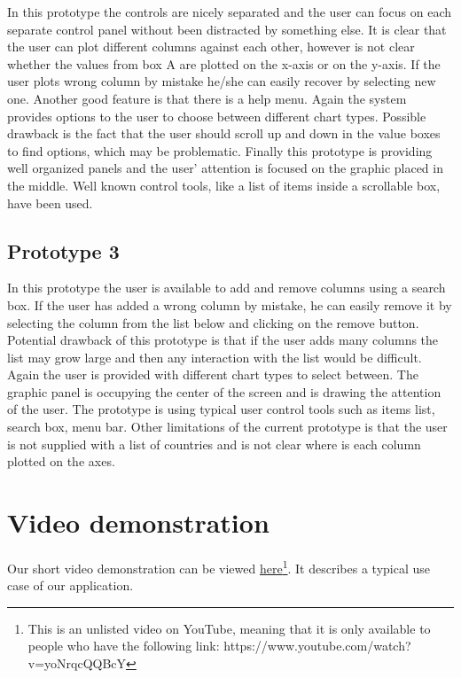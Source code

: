 \documentclass[a4paper]{article}
\begin{document}
In this prototype the controls are nicely separated and the user can focus on each separate control panel without been distracted by something else. It is clear that the user can plot different columns against each other, however is not clear whether the values from box A are plotted on the x-axis or on the y-axis. If the user plots wrong column by mistake he/she can easily recover by selecting new one. Another good feature is that there is a help menu. Again the system provides options to the user to choose between different chart types. Possible drawback is the fact that the user should scroll up and down in the value boxes to find options, which may be problematic. Finally this prototype is providing well organized panels and the user’ attention is focused on the graphic placed in the middle. Well known control tools, like a list of items inside a scrollable box, have been used. 

\subsection{Prototype 3}

In this prototype the user is available to add and remove columns using a search box. If the user has added a wrong column by mistake, he can easily remove it by selecting the column from the list below and clicking on the remove button. Potential drawback of this prototype is that if the user adds many columns the list may grow large and then any interaction with the list would be difficult. Again the user is provided with different chart types to select between. The graphic panel is occupying the center of the screen and is drawing the attention of the user. The prototype is using typical user control tools such as items list, search box, menu bar. Other limitations of the current prototype is that the user is not supplied with a list of countries and is not clear where is each column plotted on the axes.

\section{Video demonstration}

Our short video demonstration can be viewed \href{https://www.youtube.com/watch?v=yoNrqcQQBcY}{here}\footnote{This is an unlisted video on YouTube, meaning that it is only available to people who have the following link: https://www.youtube.com/watch?v=yoNrqcQQBcY}. It describes a typical use case of our application.
\end{document}
